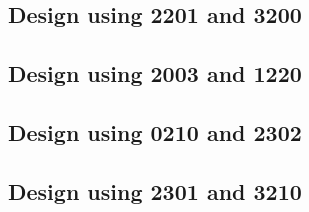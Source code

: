 \subsection{Design using 2201 and 3200}


 \begin{center}




 \end{center}



\subsection{Design using 2003 and 1220}


 \begin{center}




 \end{center}



\subsection{Design using 0210 and 2302}


 \begin{center}




 \end{center}



\subsection{Design using 2301 and 3210}

